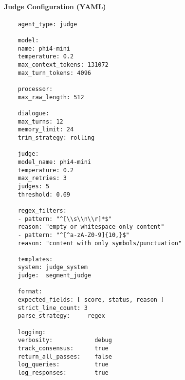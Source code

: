 \paragraph{Judge Configuration (YAML)}
\begin{verbatim}
	agent_type: judge
	
	model:
	name: phi4-mini
	temperature: 0.2
	max_context_tokens: 131072
	max_turn_tokens: 4096
	
	processor:
	max_raw_length: 512
	
	dialogue:
	max_turns: 12
	memory_limit: 24
	trim_strategy: rolling
	
	judge:
	model_name: phi4-mini
	temperature: 0.2
	max_retries: 3
	judges: 5
	threshold: 0.69
	
	regex_filters:
	- pattern: "^[\\s\\n\\r]*$"
	reason: "empty or whitespace-only content"
	- pattern: "^[^a-zA-Z0-9]{10,}$"
	reason: "content with only symbols/punctuation"
	
	templates:
	system: judge_system
	judge:  segment_judge
	
	format:
	expected_fields: [ score, status, reason ]
	strict_line_count: 3
	parse_strategy:     regex
	
	logging:
	verbosity:            debug
	track_consensus:      true
	return_all_passes:    false
	log_queries:          true
	log_responses:        true
\end{verbatim}
